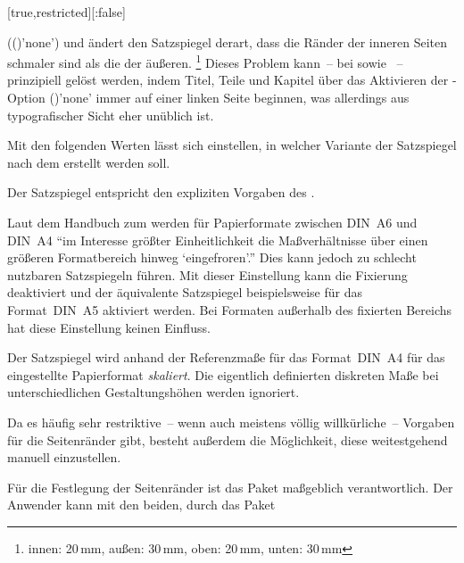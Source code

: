 \begin{Declaration*}{}
\begin{Declaration*}{}
\begin{Declaration*}{}
\begin{Declaration}[%
  v2.03;
  v2.05!\Option{cdgeometry=restricted};%
  v2.05!\Option{cdgeometry=adapted};%
  v2.05!\Option{cdgeometry=calculated};%
  v2.05!\Option{cdgeometry=custom};%
]{}[true,restricted][:false]
\begin{values}{}
  (()'none') und ändert den Satzspiegel 
  derart, dass die Ränder der inneren Seiten schmaler sind als die der äußeren.%
  \footnote{innen: 20\,mm, außen: 30\,mm, oben: 20\,mm, unten: 30\,mm}
  Dieses Problem kann~-- bei  sowie ~-- 
  prinzipiell gelöst werden, indem Titel, Teile und Kapitel über das Aktivieren 
  der \KOMAScript-Option ()'none' immer 
  auf einer linken Seite beginnen, was allerdings aus typografischer Sicht eher 
  unüblich ist.
\end{values}
%
Mit den folgenden Werten lässt sich einstellen, in welcher Variante der 
Satzspiegel nach dem \TUDCD erstellt werden soll. 
%
\begin{values}{}
\item[restricted]
  Der Satzspiegel entspricht den expliziten Vorgaben des \CDs.
\item[adapted]
  Laut dem Handbuch zum \CD werden für Papierformate zwischen DIN~A6 und DIN~A4 
  \enquote{im Interesse größter Einheitlichkeit die Maßverhältnisse über einen 
  größeren Formatbereich hinweg \enquote{eingefroren}.} Dies kann jedoch zu 
  schlecht nutzbaren Satzspiegeln führen. Mit dieser Einstellung kann die 
  Fixierung deaktiviert und der äquivalente Satzspiegel beispielsweise für das 
  Format~DIN~A5 aktiviert werden. Bei Formaten außerhalb des fixierten Bereichs 
  hat diese Einstellung keinen Einfluss. 
\item[calculated]
  Der Satzspiegel wird anhand der Referenzmaße für das Format~DIN~A4 für das 
  eingestellte Papierformat \emph{skaliert}. Die eigentlich definierten 
  diskreten Maße bei unterschiedlichen Gestaltungshöhen werden ignoriert.
\end{values}
%
Da es häufig sehr restriktive~-- wenn auch meistens völlig willkürliche~-- 
Vorgaben für die Seitenränder gibt, besteht außerdem die Möglichkeit, diese 
weitestgehend manuell einzustellen. 
\begin{values}{}
\item[custom]
  Für die Festlegung der Seitenränder ist das Paket  
  maßgeblich verantwortlich. Der Anwender kann mit den beiden, durch das Paket 

\end{values}
\end{Declaration}
\end{Declaration*}
\end{Declaration*}
\end{Declaration*}
